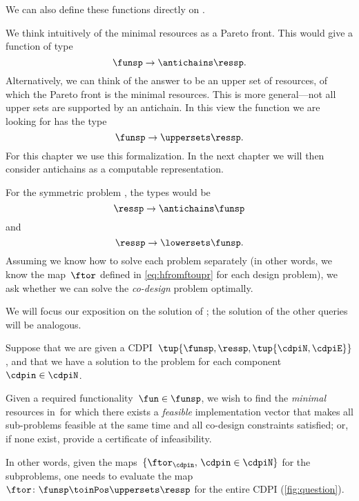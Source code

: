 We can also define these functions directly on \DP.

We think intuitively of the minimal resources as a Pareto front.
This would give a function of type
\begin{equation}
    \funsp \to \antichains\ressp.
\end{equation}
Alternatively, we can think of the answer to be an upper set of resources, of which the Pareto front is the minimal resources.
This is more general---not all upper sets are supported by an antichain.
In this view the function we are looking for has the type
\begin{equation}
    \funsp \to \uppersets\ressp.
\end{equation}
For this chapter we use this formalization.
In the next chapter we will then consider antichains as a computable representation.

For the symmetric problem \FixResMaxFun, the types would be
\begin{equation}
    \ressp \to \antichains\funsp
\end{equation}
and
\begin{equation}
    \ressp \to \lowersets\funsp.
\end{equation}
%
Assuming we know how to solve each problem separately (in other words, we know the map~$\ftor$ defined in \cref{eq:hfromftoupr} for each design problem), we ask whether we can solve the \emph{co-design} problem optimally.

We will focus our exposition on the solution of \FixFunMinRes; the solution of the other queries will be analogous.

\begin{problem}
\label{prob:MCDP}
Suppose that we are given a CDPI~$\tup{ \funsp,\ressp,\tup{ \cdpiN,\cdpiE} }$, and that we have a solution to the \FixFunMinRes problem for each component~$\cdpin\in\cdpiN$.

Given a required functionality~$\fun\in\funsp$, we wish to find the \emph{minimal} resources in~\ressp for which there exists a \emph{feasible} implementation vector that makes all sub-problems feasible at the same time and all co-design constraints satisfied; or, if none exist, provide a certificate of infeasibility.
\end{problem}
In other words, given the maps~$\{\ftor_{\cdpin},\,\cdpin\in\cdpiN\}$ for the subproblems, one needs to evaluate  the map~$\ftor\colon\funsp \toinPos \uppersets \ressp$ for the entire CDPI (\cref{fig:question}).


